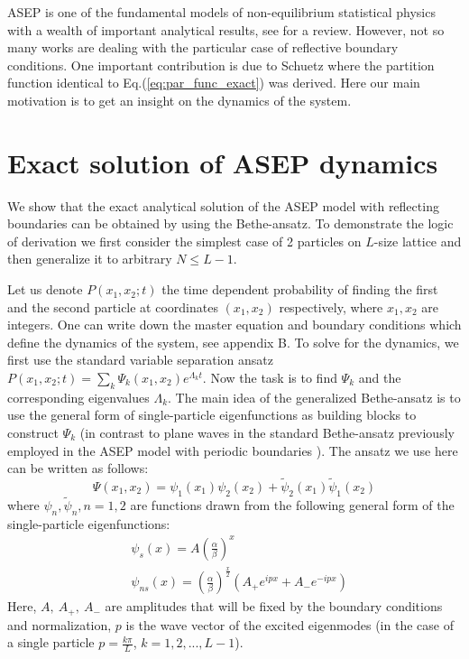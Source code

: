 \documentclass[aps,showpacs,twocolumn,floatfix,prx,superscriptaddress]{revtex4-1}
\begin{document}
ASEP is one of the fundamental models of non-equilibrium statistical physics with a wealth of important analytical results, see \cite{} for a review. However, not so many works are dealing with the particular case of reflective boundary conditions. One important contribution is due to Schuetz \cite{} where the partition function identical to Eq.(\ref{eq:par_func_exact}) was derived. Here our main motivation is to get an insight on the dynamics of the system. 

\section{Exact solution of ASEP dynamics}
We show that the exact analytical solution of the ASEP model with reflecting boundaries can be obtained by using the Bethe-ansatz. To demonstrate the logic of derivation we first consider the simplest case of 2 particles on $L$-size lattice and then generalize it to arbitrary $N\leq L-1$.

Let us denote $P(x_1, x_2; t)$ the time dependent probability of finding the first and the second particle at coordinates $(x_1, x_2)$ respectively, where $x_1, x_2$ are integers. One can write down the master equation and boundary conditions which define the dynamics of the system, see appendix B. To solve for the dynamics, we first use the standard variable separation ansatz $P(x_1, x_2; t) = \sum_k { \Psi_k(x_1, x_2) e^{\Lambda_k t}}$. Now the task is to find $\Psi_k$ and the corresponding eigenvalues $\Lambda_k$. The main idea of the generalized Bethe-ansatz is to use the general form of single-particle eigenfunctions as building blocks to construct $\Psi_k$ (in contrast to plane waves in the standard Bethe-ansatz previously employed in the ASEP model with periodic boundaries \cite{}). The ansatz we use here can be written as follows:
\begin{equation}
    \label{eq:ansatzTwo}
    \Psi(x_1, x_2) = \psi_1(x_1)\psi_2(x_2) + \tilde{\psi}_2(x_1)\tilde{\psi}_1(x_2)
\end{equation}
where $\psi_n, \tilde{\psi}_n, n=1,2$ are functions drawn from the following general form of the single-particle eigenfunctions:
\begin{subequations}
    \label{eq:eigenModes}
\begin{eqnarray}
    \label{eq:stationaryEigenMode}
    &\psi_s(x)  =  A\left(\frac{\alpha}{\beta}\right)^x \\
    \label{eq:nonstationaryEigenModes}
    &\psi_{ns}(x)  =  \left(\frac{\alpha}{\beta}\right)^{\frac{x}{2}}
    \left(A_+ e^{ipx} +  A_-e^{-ipx}\right) 
\end{eqnarray}
\end{subequations}
Here, $A,~A_+,~A_-$ are amplitudes that will be fixed by the boundary conditions and normalization, $p$ is the wave vector of the excited eigenmodes (in the case of a single particle $p=\frac{k\pi}{L}$, $k=1,2,...,L-1$).
\end{document}
